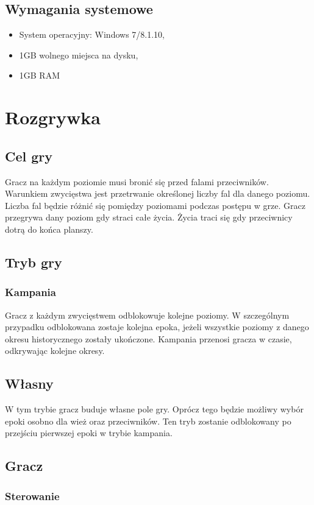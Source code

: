 \documentclass[a4paper,12pt, twoside, titlepage]{article}
\begin{document}
\subsection{Wymagania systemowe}
\begin{itemize}
	\item System operacyjny: Windows 7/8.1.10,
	\item 1GB wolnego miejsca na dysku,
	\item 1GB RAM
\end{itemize}


\newpage
\section{Rozgrywka}
\subsection{Cel gry}
Gracz na każdym poziomie musi bronić się przed falami przeciwników. Warunkiem zwycięstwa jest przetrwanie określonej liczby fal dla danego poziomu. Liczba fal będzie różnić się pomiędzy poziomami podczas postępu w grze. Gracz przegrywa dany poziom gdy straci całe życia. Życia traci się gdy przeciwnicy dotrą do końca planszy.

\subsection{Tryb gry}

\subsubsection{Kampania}
Gracz z każdym zwycięstwem odblokowuje kolejne poziomy. W szczególnym przypadku odblokowana zostaje kolejna epoka, jeżeli wszystkie poziomy z danego okresu historycznego zostały ukończone. Kampania przenosi gracza w czasie, odkrywając kolejne okresy.

\subsection{Własny}
W tym trybie gracz buduje własne pole gry. Oprócz tego będzie możliwy wybór epoki osobno dla wież oraz przeciwników. Ten tryb zostanie odblokowany po przejściu pierwszej epoki w trybie kampania.


\subsection{Gracz}
\subsubsection{Sterowanie}
\end{document}
